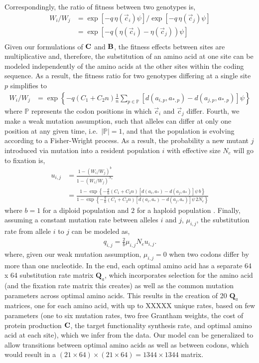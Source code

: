 \documentclass{article}
\newcommand{\Cost}{\ensuremath{\text{\textbf{C}}}\xspace}
\newcommand{\Func}{\ensuremath{\text{\textbf{B}}}\xspace}
\newcommand{\Ne}{\ensuremath{{N_e}}\xspace} %
\newcommand{\Qmatrix}{\mathbf{Q}\xspace}
\newcommand{\Qmatrixa}{\ensuremath{\Qmatrix_a}\xspace}
\newcommand{\aip}{\ensuremath{a_{i,p}}\xspace}
\newcommand{\ajp}{\ensuremath{a_{j,p}}\xspace}
\newcommand{\aopt}{\ensuremath{a_*}\xspace}
\newcommand{\aoptp}{\ensuremath{a_{*,p}}\xspace}
\newcommand{\cveci}{\ensuremath{\cvec_i}\xspace}
\newcommand{\cvecj}{\ensuremath{\cvec_j}\xspace}
\newcommand{\cvec}{\ensuremath{\Vec{c}}\xspace}
\newcommand{\muij}{\ensuremath{\mu_{i,j}}\xspace}
\newcommand{\setP}{\ensuremath{\mathbb{P}}\xspace}
\begin{document}
Correspondingly, the ratio of fitness between two genotypes is,
\begin{align*}
  W_i/W_j &=  \exp\left[- q \, \eta(\cveci) \psi\right]/\exp\left[- q \, \eta(\cvecj) \psi\right]\\
  &=  \exp\left[- q \left(\eta(\cveci)- \eta(\cvecj)\right) \psi\right]\\
\end{align*}
Given our formulations of \Cost and \Func, the fitness effects between sites are multiplicative and, therefore, the substitution of an amino acid at one site can be modeled independently of the amino acids at the other sites within the coding sequence.
As a result, the fitness ratio for two genotypes differing at a single site $p$ simplifies to
\begin{align}
 W_i/W_j  &= \exp\left\{- q \left(C_1 + C_2 n\right) \frac{1}{n} \sum_{p \in \setP} \left[d\left(\aip,\aoptp\right) - d\left(\ajp,\aoptp\right)\right] \psi \right\}
\end{align}
where \setP represents the codon positions in which \cveci and \cvecj differ.
Fourth, we make a weak mutation assumption, such that alleles can differ at only one position at any given time, i.e.~$|\setP| = 1$, and that the population is evolving according to a Fisher-Wright process.
As a result, the probability a new mutant $j$ introduced via mutation into a resident population $i$ with effective size \Ne will go to fixation is,
\begin{align*}
  u_{i,j} &=  \frac{1 - \left(W_i/W_j\right)^b}{1 - \left(W_i/W_j\right)^\Ne}\\
   &= \frac{1- \exp\left\{- \frac{q}{n} \left(C_1 + C_2 n\right) \left[d\left(a_i,\aopt\right) - d\left(a_j,\aopt\right)\right] \psi \,  b\right\}}  {1-\exp\left\{- \frac{q}{n} \left(C_1 + C_2 n\right) \left[d\left(a_i,\aopt\right) - d\left(a_j,\aopt\right)\right] \psi \, 2\Ne\right\}}
\end{align*}
where $b=1$ for a diploid population and $2$ for a haploid population \citep{Kimura1962,Wright1969,Iwasa1988,BergAndLassig2003,SellaAndHirsh2005}.
Finally, assuming a constant mutation rate between alleles $i$ and $j$, $\muij$, the substitution rate from allele $i$ to $j$ can be modeled as,
\begin{align*}
  q_{i,j} = \frac{2}{b} \muij \Ne u_{i,j}.
\end{align*}
where, given our weak mutation assumption, $\muij = 0$ when two codons differ by more than one nucleotide.
In the end, each optimal amino acid has a separate 64 x 64 substitution rate matrix \Qmatrixa, which incorporates selection for the amino acid (and the fixation rate matrix this creates) as well as the common mutation parameters across optimal amino acids.
This results in the creation of 20  \Qmatrixa  matrices, one for each amino acid, with up to XXXXX unique rates, based on few parameters (one to six mutation rates, two free Grantham weights, the cost of protein production \Cost, the target functionality synthesis rate, and optimal amino acid at each site), which we infer from the data.
Our model can be generalized to allow  transitions between optimal amino acids as well as between codons, which would result in a $(21 \times 64) \times (21 \times 64) =  1344 \times 1344$ matrix.
\end{document}
